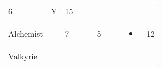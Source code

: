 \documentclass[12pt]{article}
\newcommand{\indexClass}[1]{\index{#1}}
\newcommand{\class}[1]{#1\indexClass{#1}}
\begin{document}
\begin{longtable}[]{@{}llllllllll@{}}
\begin{minipage}[t]{0.06\columnwidth}
6
\strut\end{minipage} &
\begin{minipage}[t]{0.07\columnwidth}\raggedright\strut
Y
\strut\end{minipage} &
\begin{minipage}[t]{0.08\columnwidth}\raggedright\strut
15
\strut\end{minipage}\tabularnewline
\begin{minipage}[t]{0.13\columnwidth}\raggedright\strut
\class{Alchemist}
\strut\end{minipage} &
\begin{minipage}[t]{0.06\columnwidth}\raggedright\strut
\strut\end{minipage} &
\begin{minipage}[t]{0.06\columnwidth}\raggedright\strut
7
\strut\end{minipage} &
\begin{minipage}[t]{0.06\columnwidth}\raggedright\strut
\strut\end{minipage} &
\begin{minipage}[t]{0.06\columnwidth}\raggedright\strut
\strut\end{minipage} &
\begin{minipage}[t]{0.06\columnwidth}\raggedright\strut
5
\strut\end{minipage} &
\begin{minipage}[t]{0.06\columnwidth}\raggedright\strut
\strut\end{minipage} &
\begin{minipage}[t]{0.06\columnwidth}\raggedright\strut
\strut\end{minipage} &
\begin{minipage}[t]{0.07\columnwidth}\raggedright\strut
\begin{itemize}
\item
\end{itemize}
\strut\end{minipage} &
\begin{minipage}[t]{0.08\columnwidth}\raggedright\strut
12
\strut\end{minipage}\tabularnewline
\begin{minipage}[t]{0.13\columnwidth}\raggedright\strut
\class{Valkyrie}
\strut\end{minipage} &
\begin{minipage}[t]{0.06\columnwidth}\raggedright\strut
\strut\end{minipage} &
\begin{minipage}[t]{0.06\columnwidth}\raggedright\strut

\end{minipage}
\end{longtable}
\end{document}
